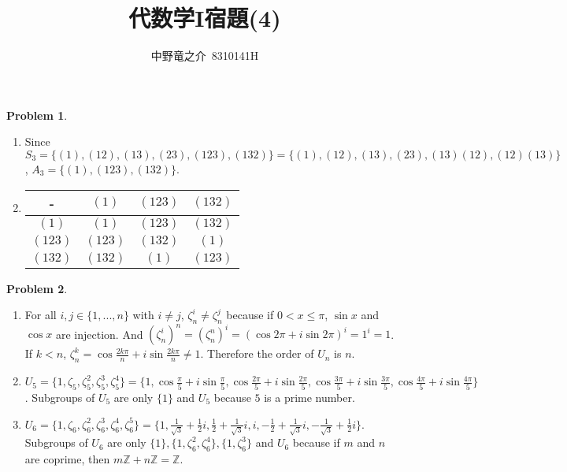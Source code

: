 \documentclass[a4paper, 12pt, fleqn]{article}
\title{代数学I宿題(4)}
\author{中野竜之介\ 8310141H}
\theoremstyle{definition}
\newtheorem{prb}{Problem}
\begin{document}
\maketitle

\begin{prb}
    $ $
    \begin{enumerate}
        \item Since $S_3 = \{(1),(12),(13),(23),(123),(132)\} = \{(1),(12),(13),(23),(13)(12),(12)(13)\}$, $A_3=\{(1),(123),(132)\}$.
        \item
            \begin{table}[htb]
                \begin{tabular}{|c||c|c|c|}
                    \hline
                    - & $(1)$ & $(123)$ & $(132)$ \\ \hline \hline
                    $(1)$ & $(1)$ & $(123)$ & $(132)$\\ \hline
                    $(123)$ & $(123)$ & $(132)$ & $(1)$\\ \hline
                    $(132)$ & $(132)$ & $(1)$ & $(123)$\\ \hline
                \end{tabular}
            \end{table}
    \end{enumerate}
\end{prb}

\begin{prb}
    $ $
    \begin{enumerate}
        \item For all $i,j\in \{1,...,n\}$ with $i\neq j$, $\zeta _n ^i \neq \zeta _n ^j$ because if $0 < x \leq \pi$, $\sin x$ and $\cos x$ are injection. And $(\zeta _n ^i)^n = (\zeta_n ^n)^i = (\cos 2\pi + i \sin 2\pi)^i = 1^i = 1$. If $k<n$, $\zeta_n ^k = \cos \frac{2k\pi}{n} + i\sin \frac{2k\pi}{n} \neq 1$. Therefore the order of $U_n$ is $n$.
        \item $U_5 = \{1, \zeta_5 ,\zeta_5 ^2,\zeta_5 ^3,\zeta_5 ^4\} = \{1,\cos \frac{\pi}{5} + i\sin \frac{\pi}{5},\cos \frac{2\pi}{5} + i\sin \frac{2\pi}{5},\cos \frac{3\pi}{5} + i\sin \frac{3\pi}{5},\cos \frac{4\pi}{5} + i\sin \frac{4\pi}{5}\}$. Subgroups of $U_5$ are only $\{1\}$ and $U_5$ because $5$ is a prime number.
        \item $U_6 = \{1, \zeta_6 ,\zeta_6 ^2,\zeta_6 ^3,\zeta_6 ^4,\zeta_6 ^5\} = \{1,\frac{1}{\sqrt{3}}+\frac{1}{2}i,\frac{1}{2} + \frac{1}{\sqrt{3}}i,i,-\frac{1}{2}+\frac{1}{\sqrt3}i,-\frac{1}{\sqrt{3}}+\frac{1}{2}i\}$.\\
        Subgroups of $U_6$ are only $\{1\},\{1,\zeta_6 ^2,\zeta_6^4\},\{1,\zeta_6 ^3\}$ and $U_6$ because if $m$ and $n$ are coprime, then $m\mathbb{Z}+n\mathbb{Z} = \mathbb{Z}$.
    \end{enumerate}
\end{prb}
\end{document}
